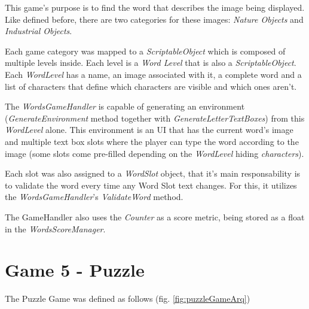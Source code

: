 This game's purpose is to find the word that describes the image being displayed. Like defined before, there are two categories for these images: \textit{Nature Objects} and \textit{Industrial Objects}.

Each game category was mapped to a \textit{ScriptableObject} which is composed of multiple levels inside. Each level is a \textit{Word Level} that is also a \textit{ScriptableObject}. Each \textit{WordLevel} has a name, an image associated with it, a complete word and a list of characters that define which characters are visible and which ones aren't.

The \textit{WordsGameHandler} is capable of generating an environment (\textit{GenerateEnvironment} method together with \textit{GenerateLetterTextBoxes}) from this \textit{WordLevel} alone. This environment is an UI that has the current word's image and multiple text box slots where the player can type the word according to the image (some slots come pre-filled depending on the \textit{WordLevel} hiding \textit{characters}).

Each slot was also assigned to a \textit{WordSlot} object, that it's main responsability is to validate the word every time any Word Slot text changes. For this, it utilizes the \textit{WordsGameHandler}'s \textit{ValidateWord} method.

The GameHandler also uses the \textit{Counter} as a score metric, being stored as a float in the \textit{WordsScoreManager}.

\newpage
\section{Game 5 - Puzzle}

The Puzzle Game was defined as follows (fig. \ref*{fig:puzzleGameArq})

